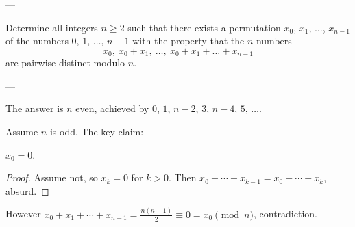 
---

Determine all integers $n\ge2$ such that there exists a permutation $x_0$, $x_1$, $\ldots$, $x_{n-1}$ of the numbers $0$, $1$, $\ldots$, $n-1$ with the property that the $n$ numbers \[x_0,\ x_0+x_1,\ \ldots, \ x_0+x_1+\ldots+x_{n-1}\]
are pairwise distinct modulo $n$.

---

The answer is $n$ even, achieved by $0$, $1$, $n-2$, $3$, $n-4$, $5$, $\ldots$.

Assume $n$ is odd. The key claim:
\begin{iclaim*}
    $x_0=0$.
\end{iclaim*}
\begin{proof}
    Assume not, so $x_k=0$ for $k>0$. Then $x_0+\cdots+x_{k-1}=x_0+\cdots+x_k$, absurd.
\end{proof}

However $x_0+x_1+\cdots+x_{n-1}=\frac{n(n-1)}2\equiv0=x_0\pmod n$, contradiction.

